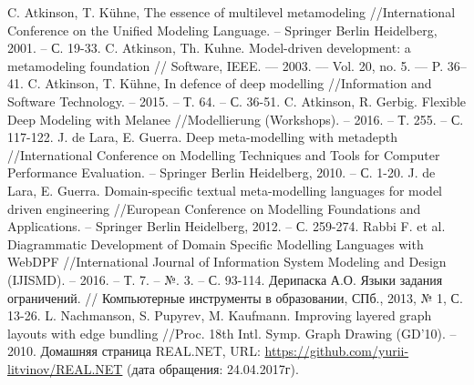 \documentclass{spisok-article}
\begin{document}
\begin{thebibliography}{8}
	 C. Atkinson, T. Kühne, The essence of multilevel metamodeling //International Conference on the Unified Modeling Language. -- Springer Berlin Heidelberg, 2001. -- С. 19-33.
	 C. Atkinson, Th. Kuhne. Model-driven development: a metamodeling foundation // Software, IEEE. –– 2003. –– Vol. 20, no. 5. –– P. 36–41.
	 C. Atkinson, T. Kühne, In defence of deep modelling //Information and Software Technology. -- 2015. -- Т. 64. -- С. 36-51.
	 C. Atkinson, R. Gerbig. Flexible Deep Modeling with Melanee //Modellierung (Workshops). -- 2016. -- Т. 255. -- С. 117-122.
	 J. de Lara, E. Guerra. Deep meta-modelling with metadepth //International Conference on Modelling Techniques and Tools for Computer Performance Evaluation. -- Springer Berlin Heidelberg, 2010. -- С. 1-20.
	 J. de Lara, E. Guerra. Domain-specific textual meta-modelling languages for model driven engineering //European Conference on Modelling Foundations and Applications. -- Springer Berlin Heidelberg, 2012. -- С. 259-274.
	 Rabbi F. et al. Diagrammatic Development of Domain Specific Modelling Languages with WebDPF //International Journal of Information System Modeling and Design (IJISMD). -- 2016. -- Т. 7. -- №. 3. -- С. 93-114.
	 Дерипаска А.О. Языки задания ограничений. // Компьютерные инструменты в образовании, СПб., 2013, № 1, С. 13-26.
	 L. Nachmanson, S. Pupyrev, M. Kaufmann. Improving layered graph layouts with edge bundling //Proc. 18th Intl. Symp. Graph Drawing (GD’10). -- 2010.
	 Домашняя страница REAL.NET, URL: \url{https://github.com/yurii-litvinov/REAL.NET} (дата обращения: 24.04.2017г).
\end{thebibliography}
\end{document}

